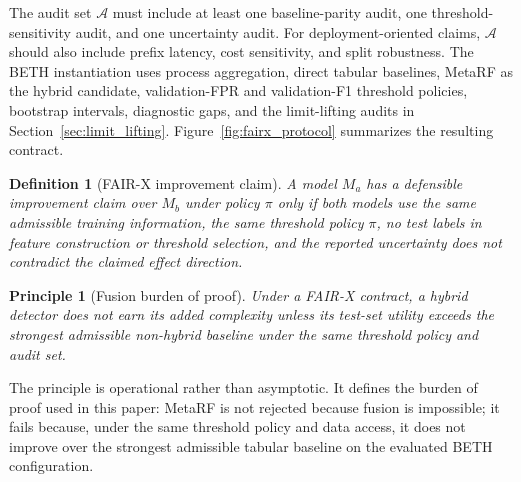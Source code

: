 \documentclass[10pt,journal,compsoc]{IEEEtran}
\newtheorem{definition}{Definition}
\newtheorem{principle}{Principle}
\begin{document}
The audit set $\mathcal{A}$ must include at least one baseline-parity audit, one threshold-sensitivity audit, and one uncertainty audit. For deployment-oriented claims, $\mathcal{A}$ should also include prefix latency, cost sensitivity, and split robustness. The BETH instantiation uses process aggregation, direct tabular baselines, MetaRF as the hybrid candidate, validation-FPR and validation-F1 threshold policies, bootstrap intervals, diagnostic gaps, and the limit-lifting audits in Section~\ref{sec:limit_lifting}. Figure~\ref{fig:fairx_protocol} summarizes the resulting contract.

\begin{definition}[FAIR-X improvement claim]
A model $M_a$ has a defensible improvement claim over $M_b$ under policy $\pi$ only if both models use the same admissible training information, the same threshold policy $\pi$, no test labels in feature construction or threshold selection, and the reported uncertainty does not contradict the claimed effect direction.
\end{definition}

\begin{principle}[Fusion burden of proof]
Under a FAIR-X contract, a hybrid detector does not earn its added complexity unless its test-set utility exceeds the strongest admissible non-hybrid baseline under the same threshold policy and audit set.
\end{principle}

The principle is operational rather than asymptotic. It defines the burden of proof used in this paper: MetaRF is not rejected because fusion is impossible; it fails because, under the same threshold policy and data access, it does not improve over the strongest admissible tabular baseline on the evaluated BETH configuration.
\end{document}
